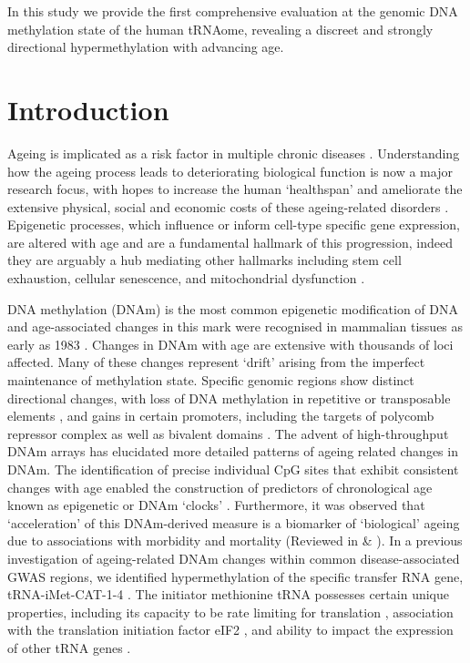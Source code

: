 \documentclass[
]{book}
\begin{document}
In this study we provide the first comprehensive evaluation at the genomic DNA methylation state of the human tRNAome, revealing a discreet and strongly directional hypermethylation with advancing age.

\newpage

\hypertarget{introduction-1}{%
\section{Introduction}\label{introduction-1}}

Ageing is implicated as a risk factor in multiple chronic diseases \citep{Partridge2018}.
Understanding how the ageing process leads to deteriorating biological function is now a major research focus, with hopes to increase the human `healthspan' and ameliorate the extensive physical, social and economic costs of these ageing-related disorders \citep{Campisi2019}.
Epigenetic processes, which influence or inform cell-type specific gene expression, are altered with age and are a fundamental hallmark of this progression, indeed they are arguably a hub mediating other hallmarks including stem cell exhaustion, cellular senescence, and mitochondrial dysfunction \citep{Lopez-Otin2013, Booth2016}.

DNA methylation (DNAm) is the most common epigenetic modification of DNA and age-associated changes in this mark were recognised in mammalian tissues as early as 1983 \citep{Wilson1983}.
Changes in DNAm with age are extensive with thousands of loci affected.
Many of these changes represent `drift' \citep{Fraga2005} arising from the imperfect maintenance of methylation state.
Specific genomic regions show distinct directional changes, with loss of DNA methylation in repetitive or transposable elements \citep{Chuong2017}, and gains in certain promoters, including the targets of polycomb repressor complex \citep{Teschendorff2010} as well as bivalent domains \citep{Rakyan2010}.
The advent of high-throughput DNAm arrays \citep{Sandoval2011, Teschendorff2010, Hannum2013} has elucidated more detailed patterns of ageing related changes in DNAm.
The identification of precise individual CpG sites that exhibit consistent changes with age enabled the construction of predictors of chronological age known as epigenetic or DNAm `clocks' \citep{Hannum2013, Horvath2013, Levine2018, Horvath2018a, Lu2019}.
Furthermore, it was observed that `acceleration' of this DNAm-derived measure is a biomarker of `biological' ageing due to associations with morbidity and mortality (Reviewed in \citep{Horvath2018} \& \citep{Field2018}).
In a previous investigation of ageing-related DNAm changes within common disease-associated GWAS regions, we identified hypermethylation of the specific transfer RNA gene, tRNA-iMet-CAT-1-4 \citep{Bell2016}.
The initiator methionine tRNA possesses certain unique properties, including its capacity to be rate limiting for translation \citep{Rideout2012}, association with the translation initiation factor eIF2 \citep{Kolitz2010}, and ability to impact the expression of other tRNA genes \citep{Pavon-Eternod2013}.
\end{document}
